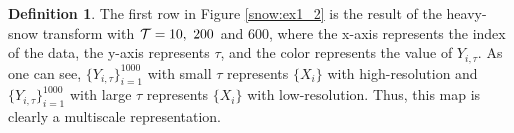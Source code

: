 \documentclass[preprint, review, 12pt]{article}
\theoremstyle{definition}
\newtheorem{dfn}{Definition}
\theoremstyle{remark}
\begin{document}
\begin{dfn}

The first row in Figure \ref{snow:ex1_2} is the result of the heavy-snow transform with ${\cal T}=10,~200$ and $600$, where the x-axis represents the index of the data, the y-axis represents $\tau$, and the color represents the value of $Y_{i,\tau}$. As one can see, $\{Y_{i,\tau}\}_{i=1}^{1000}$ with small $\tau$ represents $\{X_i\}$ with high-resolution and $\{Y_{i,\tau}\}_{i=1}^{1000}$ with large $\tau$ represents $\{X_i\}$ with low-resolution. Thus, this map is clearly a multiscale representation. 


\end{dfn}
\end{document}
